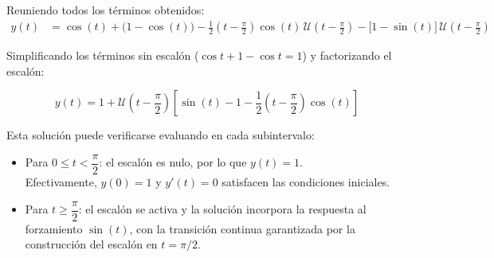 \documentclass[12pt, a4paper]{article}
\newcommand{\U}{\mathcal{U}}
\newenvironment{resultado}{%
    \begin{tcolorbox}[resultstyle]%
}{%
    \end{tcolorbox}%
}
\begin{document}
Reuniendo todos los términos obtenidos:
\begin{align*}
    y(t) &= \cos(t)
           + \bigl(1 - \cos(t)\bigr)
           - \frac{1}{2}\!\left(t-\frac{\pi}{2}\right)\cos(t)\,\U\!\left(t-\frac{\pi}{2}\right)
           - \bigl[1 - \sin(t)\bigr]\,\U\!\left(t-\frac{\pi}{2}\right)
\end{align*}

Simplificando los términos sin escalón ($\cos t + 1 - \cos t = 1$) y factorizando el escalón:

\begin{resultado}
\[
    \boxed{
        y(t) = 1 + \U\!\left(t - \frac{\pi}{2}\right)
        \left[\sin(t) - 1 - \frac{1}{2}\!\left(t - \frac{\pi}{2}\right)\cos(t)\right]
    }
\]
\end{resultado}

\medskip

Esta solución puede verificarse evaluando en cada subintervalo:

\begin{itemize}
    \item Para $0 \leq t < \dfrac{\pi}{2}$: el escalón es nulo, por lo que $y(t) = 1$. \\
          Efectivamente, $y(0) = 1$ y $y'(t) = 0$ satisfacen las condiciones iniciales.

    \item Para $t \geq \dfrac{\pi}{2}$: el escalón se activa y la solución incorpora la respuesta al forzamiento $\sin(t)$, con la transición continua garantizada por la construcción del escalón en $t = \pi/2$.
\end{itemize}

\end{document}
